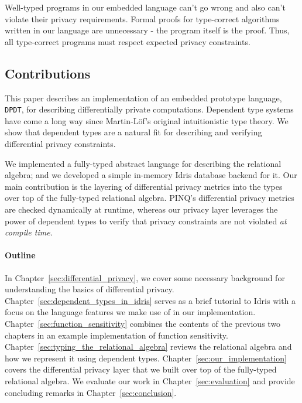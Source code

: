 \documentclass[12pt]{article}
\begin{document}
Well-typed programs in our embedded language can't go wrong and also can't violate their privacy requirements.
Formal proofs for type-correct algorithms written in our language are unnecessary - the program itself is the proof.
Thus, all type-correct programs must respect expected privacy constraints.

\subsection{Contributions}

This paper describes an implementation of an embedded prototype language, \texttt{DPDT}, for describing differentially private computations.
Dependent type systems have come a long way since Martin-L\"of's original intuitionistic type theory.
We show that dependent types are a natural fit for describing and verifying differential privacy constraints.

We implemented a fully-typed abstract language for describing the relational algebra; and we developed a simple in-memory Idris database backend for it.
Our main contribution is the layering of differential privacy metrics into the types over top of the fully-typed relational algebra.
PINQ's differential privacy metrics are checked dynamically at runtime, whereas our privacy layer leverages the power of dependent types to verify that privacy constraints are not violated \textit{at compile time}.


\paragraph{Outline}


In Chapter~\ref{sec:differential_privacy}, we cover some necessary background for understanding the basics of differential privacy.
Chapter~\ref{sec:dependent_types_in_idris} serves as a brief tutorial to Idris with a focus on the language features we make use of in our implementation.
Chapter~\ref{sec:function_sensitivity} combines the contents of the previous two chapters in an example implementation of function sensitivity.
Chapter~\ref{sec:typing_the_relational_algebra} reviews the relational algebra and how we represent it using dependent types.
Chapter~\ref{sec:our_implementation} covers the differential privacy layer that we built over top of the fully-typed relational algebra.
We evaluate our work in Chapter~\ref{sec:evaluation} and provide concluding remarks in Chapter~\ref{sec:conclusion}.
\end{document}
